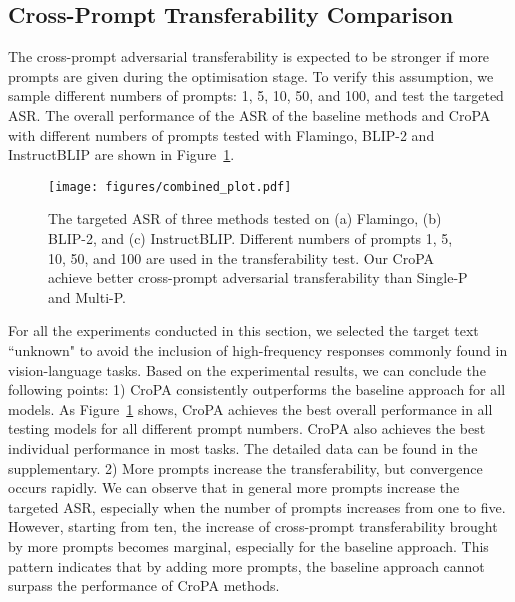 \vspace{-0.2cm}
\subsection{Cross-Prompt Transferability Comparison}
\label{sec:prompt-num}

The cross-prompt adversarial transferability is expected to be stronger if more prompts are given during the optimisation stage. To verify this assumption, we sample different numbers of prompts: 1, 5, 10, 50, and 100, and test the targeted ASR. The overall performance of the ASR of the baseline methods and CroPA with different numbers of prompts tested with Flamingo, BLIP-2 and InstructBLIP are shown in Figure~\ref{fig:number of prompts}.
\vspace{-0.1cm}
\begin{figure}[ht]
    \centering
    \texttt{[image: figures/combined\_plot.pdf]}\vspace{-0.2cm}
    \caption{\footnotesize The targeted ASR of three methods tested on (a) Flamingo, (b) BLIP-2, and (c) InstructBLIP. Different numbers of prompts 1, 5, 10, 50, and 100 are used in the transferability test. Our CroPA achieve better cross-prompt adversarial transferability than Single-P and Multi-P.}
    \label{fig:number of prompts}
\end{figure}
\vspace{-0.2cm}

For all the experiments conducted in this section, we selected the target text ``unknown" to avoid the inclusion of high-frequency responses commonly found in vision-language tasks.  Based on the experimental results, we can conclude the following points: 1) CroPA consistently outperforms the baseline approach for all models. As Figure~\ref{fig:number of prompts} shows, CroPA achieves the best overall performance in all testing models for all different prompt numbers.  CroPA also achieves the best individual performance in most tasks. The detailed data can be found in the supplementary. 2) More prompts increase the transferability, but convergence occurs rapidly. We can observe that in general more prompts increase the targeted ASR, especially when the number of prompts increases from one to five. However, starting from ten, the increase of cross-prompt transferability brought by more prompts becomes marginal, especially for the baseline approach.  This pattern indicates that by adding more prompts, the baseline approach cannot surpass the performance of CroPA methods.

